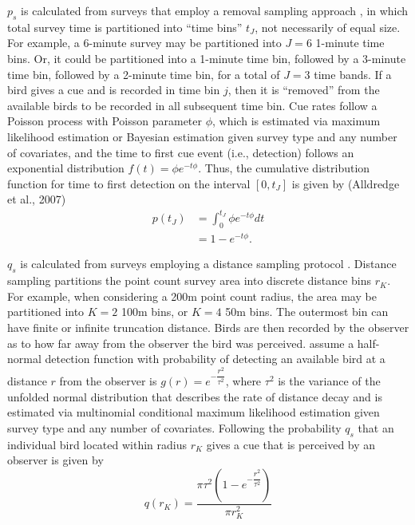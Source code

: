 \par $p_s$ is calculated from surveys that employ a removal sampling approach \citep{alldredge_time--detection_2007, farnsworth_removal_2002, solymos_evaluating_2018}, in which total survey time is partitioned into “time bins” $t_J$, not necessarily of equal size. For example, a 6-minute survey may be partitioned into $J = 6$ 1-minute time bins. Or, it could be partitioned into a 1-minute time bin, followed by a 3-minute time bin, followed by a 2-minute time bin, for a total of $J = 3$ time bands. If a bird gives a cue and is recorded in time bin $j$, then it is “removed” from the available birds to be recorded in all subsequent time bin. Cue rates follow a Poisson process with Poisson parameter $\phi$, which is estimated via maximum likelihood estimation or Bayesian estimation given survey type and any number of covariates, and the time to first cue event (i.e., detection) follows an exponential distribution $f(t) = \phi e^{-t\phi}$. Thus, the cumulative distribution function for time to first detection on the interval $\left[0, t_J\right]$ is given by (Alldredge et al., 2007)
\begin{align*}
	p(t_J) &= \int_{0}^{t_J} \phi e^{-t\phi} dt \\
	&= 1 - e^{-t\phi}.
\end{align*}

\par $q_s$ is calculated from surveys employing a distance sampling protocol \citep{buckland_introduction_2001, buckland_distance_2015}. Distance sampling partitions the point count survey area into discrete distance bins $r_K$. For example, when considering a 200m point count radius, the area may be partitioned into $K = 2$ 100m bins, or $K = 4$ 50m bins. The outermost bin can have finite or infinite truncation distance. Birds are then recorded by the observer as to how far away from the observer the bird was perceived. \citet{solymos_calibrating_2013} assume a half-normal detection function with probability of detecting an available bird at a distance $r$ from the observer is $g(r) = e^{-\dfrac{r^2}{\tau^2}}$, where $\tau^2$ is the variance of the unfolded normal distribution that describes the rate of distance decay and is estimated via multinomial conditional maximum likelihood estimation given survey type and any number of covariates. Following \citet{buckland_introduction_2001, solymos_calibrating_2013} the probability $q_s$ that an individual bird located within radius $r_K$ gives a cue that is perceived by an observer is given by
\begin{equation*}
	q(r_K) = \dfrac{\pi \tau^2 \left(1 - e^{-\dfrac{r^2}{\tau^2}}\right)}{\pi r^2_K}
\end{equation*}

